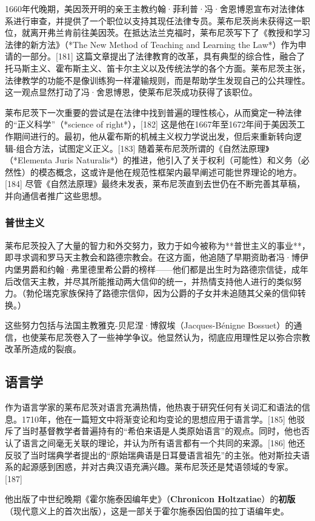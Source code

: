 1660年代晚期，美因茨开明的亲王主教约翰·菲利普·冯·舍恩博恩宣布对法律体系进行审查，并提供了一个职位以支持其现任法律专员。莱布尼茨尚未获得这一职位，就离开弗兰肯前往美因茨。在抵达法兰克福时，莱布尼茨写下了《教授和学习法律的新方法》（*The New Method of Teaching and Learning the Law*）作为申请的一部分。[181] 这篇文章提出了法律教育的改革，具有典型的综合性，融合了托马斯主义、霍布斯主义、笛卡尔主义以及传统法学的各个方面。莱布尼茨主张，法律教学的功能不是像训练狗一样灌输规则，而是帮助学生发现自己的公共理性。这一观点显然打动了冯·舍恩博恩，使莱布尼茨成功获得了该职位。

莱布尼茨下一次重要的尝试是在法律中找到普遍的理性核心，从而奠定一种法律的“正义科学”（*science of right*），[182] 这是他在1667年至1672年间于美因茨工作期间进行的。最初，他从霍布斯的机械主义权力学说出发，但后来重新转向逻辑-组合方法，试图定义正义。[183] 随着莱布尼茨所谓的《自然法原理》（*Elementa Juris Naturalis*）的推进，他引入了关于权利（可能性）和义务（必然性）的模态概念，这或许是他在规范性框架内最早阐述可能世界理论的地方。[184] 尽管《自然法原理》最终未发表，莱布尼茨直到去世仍在不断完善其草稿，并向通信者推广这些思想。
\subsubsection{普世主义}
莱布尼茨投入了大量的智力和外交努力，致力于如今被称为**普世主义的事业**，即寻求调和罗马天主教会和路德宗教会。在这方面，他追随了早期资助者冯·博伊内堡男爵和约翰·弗里德里希公爵的榜样——他们都是出生时为路德宗信徒，成年后改信天主教，并尽其所能推动两大信仰的统一，并热情支持他人进行的类似努力。（勃伦瑞克家族保持了路德宗信仰，因为公爵的子女并未追随其父亲的信仰转换。）  

这些努力包括与法国主教雅克-贝尼涅·博叙埃（Jacques-Bénigne Bossuet）的通信，也使莱布尼茨卷入了一些神学争议。他显然认为，彻底应用理性足以弥合宗教改革所造成的裂痕。
\subsection{语言学}
作为语言学家的莱布尼茨对语言充满热情，他热衷于研究任何有关词汇和语法的信息。1710年，他在一篇短文中将渐变论和均变论的思想应用于语言学。[185] 他驳斥了当时基督教学者普遍持有的“希伯来语是人类原始语言”的观点。同时，他也否认了语言之间毫无关联的理论，并认为所有语言都有一个共同的来源。[186] 他还反驳了当时瑞典学者提出的“原始瑞典语是日耳曼语言祖先”的主张。他对斯拉夫语系的起源感到困惑，并对古典汉语充满兴趣。莱布尼茨还是梵语领域的专家。[187]

他出版了中世纪晚期《霍尔施泰因编年史》（\textbf{Chronicon Holtzatiae}）的\textbf{初版}（现代意义上的首次出版），这是一部关于霍尔施泰因伯国的拉丁语编年史。
